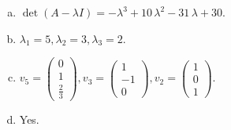 \begin{questions}
\begin{solution}
\begin{enumerate}[(a)]
\item $\det(A-\lambda I)=-{\lambda}^{3} + 10 \, {\lambda}^{2} - 31 \, {\lambda} + 30$.
\item ${\lambda}_1=5, {\lambda}_2=3, {\lambda}_3=2$.
\item $v_{5}=\left(\begin{array}{r}
0 \\
1 \\
\frac{2}{3}
\end{array}\right), v_{3}=\left(\begin{array}{r}
1 \\
-1 \\
0
\end{array}\right), v_{2}=\left(\begin{array}{r}
1 \\
0 \\
1
\end{array}\right)$.
\item Yes.
\end{enumerate}
\end{solution}

\end{questions}

\newpage


\begin{center}
\end{center}

